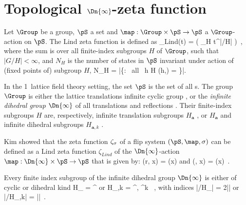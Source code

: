 

\section{Topological $\Dn{\infty}$-zeta function}
\label{sect:LC21Lind1d}    %


Let $\Group$ be a group, $\pS$ a set and $\map: \Group \times \pS \to
\pS$ a $\Group$-action on $\pS$. The Lind zeta function is
defined as
\beq
\zeta_{Lind}(t) =
\exp \left( \sum_{H} \;
            t^{|\Group/H|}
      \right)
\,,
where the sum is over all finite-index subgroups $H$ of $\Group$,
such that $|G/H| < \infty$, and $N_{H}$ is the number of states
in $\pS$ invariant under action of (fixed points of) subgroup $H$,
\beq
N_{H} =
   |\{\Xx \in \pS : \mbox{ all } h \in H \quad \map(h,\Xx) = \Xx\}|.

In the 1\dmn\ lattice field theory setting, the set $\pS$ is the set of
all {\lattstate}s. The group $\Group$ is either the lattice translations
{infinite cyclic group}  \Cn{\infty} , or the
\emph{infinite dihedral group} $\Dn{\infty}$  of all translations and
reflections . Their finite-index subgroups $H$ are,
respectively, infinite translation subgroups $H_{\mathbf{a}}$
, or $H_{\mathbf{a}}$ and infinite dihedral subgroups
$H_{\mathbf{a},k}$ .




Kim \etal{} showed that the zeta function $\zeta_{\sigma}$ of a
flip system $(\pS, \map, \Refl)$ can be defined as
a Lind zeta function $\zeta_{Lind}$ of the
$\Dn{\infty}$-action $\map: \Dn{\infty} \times \pS \to \pS$ that is
given by:
\beq
\map(r, x) = \map(x)
\quad \mbox{and} \quad
\map(\Refl, x) = \Refl(x)
\,.

Every finite index subgroup of the {infinite dihedral group} $\Dn{\infty}$
is either of cyclic or dihedral kind
\beq
H_{\cl{}} = \langle \shift^\cl{} \rangle
    \qquad \mbox{or} \qquad
H_{\cl{},k} = \langle \shift^\cl{}, \shift^k \Refl \rangle \, ,
with indices
\beq
|\Dn{\infty}/H_{\cl{}}| =  2|\cl{}|
    \qquad \mbox{or} \qquad
|\Dn{\infty}/H_{\cl{},k}| = |\cl{}|
\,.

